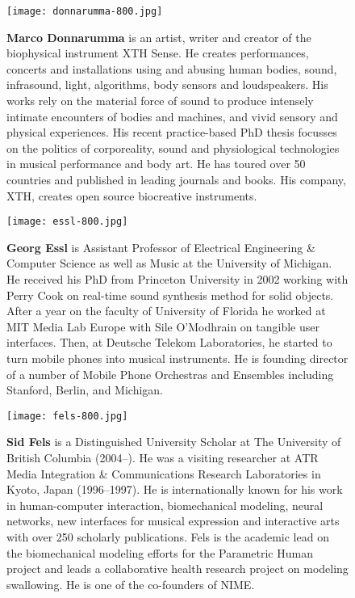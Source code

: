 \begin{authbio}
\begin{figure}[H]
  \sidecaption[t]
  \texttt{[image: donnarumma-800.jpg]}
  \caption{\textbf{Marco Donnarumma} is an artist, writer and creator of the biophysical instrument XTH Sense. He creates performances, concerts and installations using and abusing human bodies, sound, infrasound, light, algorithms, body sensors and loudspeakers. His works rely on the material force of sound to produce intensely intimate encounters of bodies and machines, and vivid sensory and physical experiences. His recent practice-based PhD thesis focusses on the politics of corporeality, sound and physiological technologies in musical performance and body art. He has toured over 50 countries and published in leading journals and books. His company, XTH, creates open source biocreative instruments.}
\end{figure}

\begin{figure}[H]
  \sidecaption[t]
  \texttt{[image: essl-800.jpg]}
  \caption{\textbf{Georg Essl} is Assistant Professor of Electrical Engineering \& Computer Science as well as Music at the University of Michigan. He received his PhD from Princeton University in 2002 working with Perry Cook on real-time sound synthesis method for solid objects. After a year on the faculty of University of Florida he worked at MIT Media Lab Europe with Sile O'Modhrain on tangible user interfaces. Then, at Deutsche Telekom Laboratories, he started to turn mobile phones into musical instruments. He is founding director of a number of Mobile Phone Orchestras and Ensembles including Stanford, Berlin, and Michigan.}
\end{figure}

\begin{figure}[H]
  \sidecaption[t]
  \texttt{[image: fels-800.jpg]}
  \caption{\textbf{Sid Fels} is a Distinguished University Scholar at The University of British Columbia (2004--). He was a visiting researcher at ATR Media Integration \& Communications Research Laboratories in Kyoto, Japan (1996--1997). He is internationally known for his work in human-computer interaction, biomechanical modeling, neural networks, new interfaces for musical expression and interactive arts with over 250 scholarly publications. Fels is the academic lead on the biomechanical modeling efforts for the Parametric Human project and leads a collaborative health research project on modeling swallowing. He is one of the co-founders of NIME. }
\end{figure}


\end{authbio}
